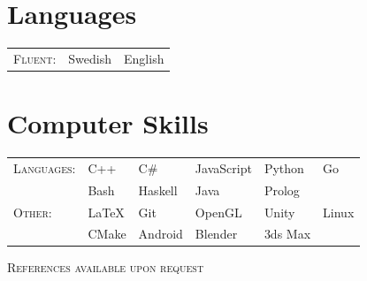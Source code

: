 \documentclass[a4paper,10pt]{article}
\begin{document}
	\section{Languages}
	\begin{tabular}{R{2cm} C{2cm} C{2cm}}
		\textsc{Fluent:}	& Swedish	& English\\
	\end{tabular}

	\section{Computer Skills}
	\def\arraystretch{1.2}%
	\begin{tabu}{R{2cm} X[c] X[c] X[c] X[c] X[c]}
		\textsc{Languages:}		&	C++		& C\#		&   JavaScript	&	Python	&   Go 	\\
								&	Bash	&   Haskell	&	Java 	&	Prolog \\
		\textsc{Other:}			&	LaTeX	&   Git		&	OpenGL		& 	Unity	&	Linux\\
				        		&	CMake	&	Android	&	Blender &	3ds Max		\\
	\end{tabu}
	\vspace{0.1cm}

	\centering\textsc{ References available upon request}
\end{document}
